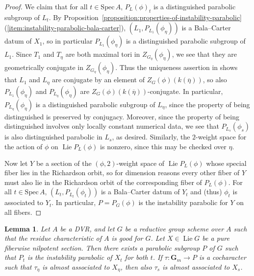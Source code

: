 \documentclass[11pt,reqno]{amsart}
\newtheorem{lemma}[theorem]{Lemma}
\theoremstyle{definition}
\newcommand{\Spec}{\mathrm{Spec} \,}
\newcommand{\bG}{{\mathbf G}}
\DeclareMathOperator{\Lie}{Lie}
\begin{document}
\begin{proof}
We claim that for all $t \in \Spec A$, $P_L(\phi)_t$ is a distinguished parabolic subgroup of $L_t$. By Proposition~\ref{proposition:properties-of-instability-parabolic}(\ref{item:instability-parabolic-bala-carter}), $(L_1, P_{L_1}(\phi_\eta))$ is a Bala--Carter datum of $X_1$, so in particular $P_{L_1}(\phi_\eta)$ is a distinguished parabolic subgroup of $L_1$. Since $T_1$ and $T_\eta$ are both maximal tori in $Z_{G_\eta}(\phi_\eta)$, we see that they are geometrically conjugate in $Z_{G_\eta}(\phi_\eta)$. Thus the uniqueness assertion in \cite[Prop.\ 5.4.5]{Conrad} shows that $L_1$ and $L_\eta$ are conjugate by an element of $Z_G(\phi)(k(\overline{\eta}))$, so also $P_{L_1}(\phi_\eta)$ and $P_{L_\eta}(\phi_\eta)$ are $Z_G(\phi)(k(\overline{\eta}))$-conjugate. In particular, $P_{L_\eta}(\phi_\eta)$ is a distinguished parabolic subgroup of $L_\eta$, since the property of being distinguished is preserved by conjugacy. Moreover, since the property of being distinguished involves only locally constant numerical data, we see that $P_{L_s}(\phi_s)$ is also distinguished parabolic in $L_s$, as desired. Similarly, the $2$-weight space for the action of $\phi$ on $\Lie P_L(\phi)$ is nonzero, since this may be checked over $\eta$. \smallskip

Now let $Y$ be a section of the $(\phi, 2)$-weight space of $\Lie P_L(\phi)$ whose special fiber lies in the Richardson orbit, so for dimension reasons every other fiber of $Y$ must also lie in the Richardson orbit of the corresponding fiber of $P_L(\phi)$. For all $t \in \Spec A$, $(L_t, P_{L_t}(\phi_t))$ is a Bala--Carter datum of $Y_t$ and (thus) $\phi_t$ is associated to $Y_t$. In particular, $P = P_G(\phi)$ is the instability parabolic for $Y$ on all fibers.
\end{proof}

\begin{lemma}\label{lemma:mcninch-relative-instability-parabolic}
Let $A$ be a DVR, and let $G$ be a reductive group scheme over $A$ such that the residue characteristic of $A$ is good for $G$. Let $X \in \Lie G$ be a pure fiberwise nilpotent section. Then there exists a parabolic subgroup $P$ of $G$ such that $P_t$ is the instability parabolic of $X_t$ for both $t$. If $\tau: \bG_m \to P$ is a cocharacter such that $\tau_\eta$ is almost associated to $X_\eta$, then also $\tau_s$ is almost associated to $X_s$.
\end{lemma}
\end{document}
